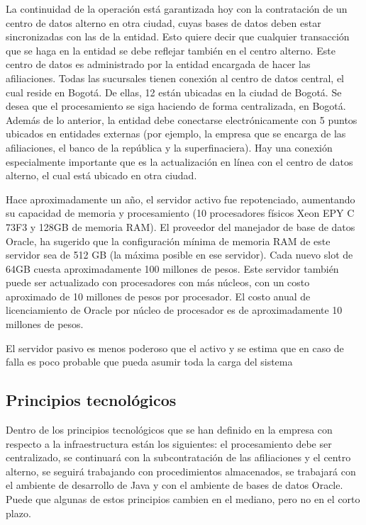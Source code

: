 \documentclass[a4paper]{article}
\begin{document}
La continuidad de la operación está garantizada hoy con la contratación de un centro de datos alterno en otra
ciudad, cuyas bases de datos deben estar sincronizadas con las de la entidad. Esto quiere decir que cualquier
transacción que se haga en la entidad se debe reflejar también en el centro alterno. Este centro de datos es
administrado por la entidad encargada de hacer las afiliaciones.
Todas las sucursales tienen conexión al centro de datos central, el cual reside en Bogotá. De ellas, 12 están ubicadas
en la ciudad de Bogotá. Se desea que el procesamiento se siga haciendo de forma centralizada, en Bogotá.
Además de lo anterior, la entidad debe conectarse electrónicamente con 5 puntos ubicados en entidades externas
(por ejemplo, la empresa que se encarga de las afiliaciones, el banco de la república y la superfinaciera). Hay una
conexión especialmente importante que es la actualización en línea con el centro de datos alterno, el cual está
ubicado en otra ciudad.

Hace aproximadamente un año, el servidor activo fue repotenciado, aumentando su capacidad de memoria y
procesamiento (10 procesadores físicos Xeon EPY C 73F3 y 128GB de memoria RAM). El proveedor del manejador
de base de datos Oracle, ha sugerido que la configuración mínima de memoria RAM de este servidor sea de 512 GB
(la máxima posible en ese servidor). Cada nuevo slot de 64GB cuesta aproximadamente 100 millones de pesos. Este
servidor también puede ser actualizado con procesadores con más núcleos, con un costo aproximado de 10 millones
de pesos por procesador. El costo anual de licenciamiento de Oracle por núcleo de procesador es de
aproximadamente 10 millones de pesos.

El servidor pasivo es menos poderoso que el activo y se estima que en caso de falla es poco probable que pueda
asumir toda la carga del sistema

\subsection{Principios tecnológicos}

Dentro de los principios tecnológicos que se han definido en la empresa con respecto a la infraestructura están los
siguientes: el procesamiento debe ser centralizado, se continuará con la subcontratación de las afiliaciones y el
centro alterno, se seguirá trabajando con procedimientos almacenados, se trabajará con el ambiente de desarrollo
de Java y con el ambiente de bases de datos Oracle. Puede que algunas de estos principios cambien en el mediano,
pero no en el corto plazo.
\end{document}
